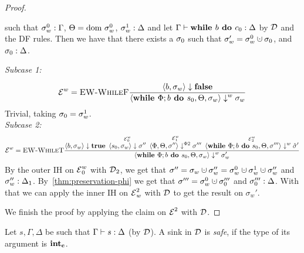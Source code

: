 \begin{proof}
\begin{claim}
        such that ${\sigma_w^0}:{\Gamma}$, $\Theta = \text{dom }{\sigma}^0_w$, ${\sigma_w^1}:{\Delta}$
        and let $\Gamma \vdash {\textbf{while }{b} \textbf{ do } {c_0}}: \Delta$ by $\operatorname{\mathcal{D}}$ and the DF rules.
        Then we have that there exists a $\sigma_0$ such that $\store_w' = \store_w^0 \dunion \store_0$,
        and ${\sigma_0}:{\Delta}$.
    \end{claim}
    \begin{claimproof}
        \emph{Subcase 1:}
        \begin{align*}
            \operatorname{\mathcal{E}}^w = \textsc{EW-WhileF}\frac{\displaystyle 
            \overset{}{\langle b, \sigma_w \rangle \downarrow \textbf{false}}}{\displaystyle \langle \textbf{while }\Phi;{b} \textbf{ do } {s_0}, \Theta, \sigma_w \rangle \downarrow^w \sigma_w}
        \end{align*}
        Trivial, taking $\sigma_0 = \sigma_w^1$.\\
        \emph{Subcase 2:}
        \begin{align*}
            \operatorname{\mathcal{E}}^w = \textsc{EW-WhileT}\frac{\displaystyle \overset{}{\langle b, \sigma_w \rangle \downarrow \textbf{true}} \enskip
            \overset{\operatorname{\mathcal{E}}^w_0}{\langle s_0, \sigma_w \rangle \downarrow \sigma''} \enskip
            \overset{\operatorname{\mathcal{E}}^w_1}{\langle \Phi, \Theta, \sigma'' \rangle \downarrow^{\Phi2} \sigma'''} \enskip
            \overset{\operatorname{\mathcal{E}}^w_2}{\langle \textbf{while }\Phi;{b} \textbf{ do } {s_0}, \Theta, \sigma''' \rangle \downarrow^w \hat{\sigma}'}}{\displaystyle \langle \textbf{while }\Phi;{b} \textbf{ do } {s_0}, \Theta, \sigma_w \rangle \downarrow^w \sigma_w'}
        \end{align*}
        By the outer IH on $\operatorname{\mathcal{E}}^w_0$ with $\operatorname{\mathcal{D}}_2$, we get that
        $\sigma'' = \sigma_w \dunion \sigma_w'' = \sigma_w^0 \dunion \sigma_w^1 \dunion \sigma_w''$
        and ${\sigma_w''}:{\Delta_1}$.
        By~\autoref{thm:preservation-phi} we get that $\store''' = \store_w^0 \dunion \store_0'''$ and
        ${\sigma_0'''}:{\Delta}$.
        With that we can apply the inner IH on $\operatorname{\mathcal{E}}^2_w$ with $\operatorname{\mathcal{D}}$ to get the result on $\sigma_w'$.
    \end{claimproof}
    We finish the proof by applying the claim on $\operatorname{\mathcal{E}}^2$ with $\operatorname{\mathcal{D}}$.
\end{proof}


\begin{definition}
    Let $s, \Gamma, \Delta$ be such that $\Gamma \vdash {s}: \Delta$ (by $\operatorname{\mathcal{D}}$).
    A sink in $\operatorname{\mathcal{D}}$ is \emph{safe}, if the type of its argument is $\textbf{int}_\textbf{c}$.
\end{definition}

